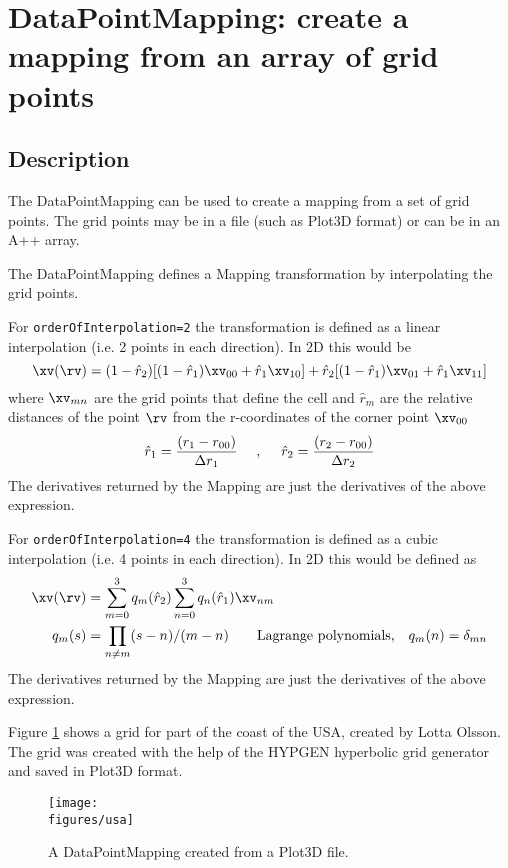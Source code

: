 \section{DataPointMapping: create a mapping from an array of grid points}

\subsection{Description}

The {\ff DataPointMapping} can be used to create a mapping from
a set of grid points.  The grid points may be in a file (such as Plot3D
format) or can be in an A++ array.


\newcommand{\rh}{\hat{r}}
\newcommand{\rvh}{\hat{\rv}}

The {\ff DataPointMapping} defines a Mapping transformation by interpolating
the grid points. 

For {\tt orderOfInterpolation=2} the transformation is
defined as a linear interpolation (i.e. 2 points in each direction). In 2D this would
be
\[
   \xv(\rv) = (1-\rh_2) [ (1-\rh_1)\xv_{00} + \rh_1\xv_{10} ]
            +    \rh_2  [ (1-\rh_1)\xv_{01} + \rh_1\xv_{11} ]
\]
where $\xv_{mn}$ are the grid points that define the cell and $\rh_m$
are the relative distances of the point $\rv$ from the r-coordinates
of the corner point $\xv_{00}$
\[
        \rh_1 = { (r_1-r_{00}) \over \Delta r_1 } ~~~~,~~~~
        \rh_2 = { (r_2-r_{00}) \over \Delta r_2 }
\]
The derivatives returned by the Mapping are just the derivatives of the
above expression. 


For {\tt orderOfInterpolation=4} the transformation is
defined as a cubic interpolation (i.e. 4 points in each direction).
In 2D this would be defined as
\begin{align}
   \xv(\rv) & =  \sum_{m=0}^3 q_m(\rh_2) \sum_{n=0}^3 q_n(\rh_1) \xv_{nm}  \\
   q_m(s) & = \prod_{n\ne m} (s-n)/(m-n) \qquad \mbox{Lagrange polynomials,} \quad q_m(n)=\delta_{mn}
\end{align}
The derivatives returned by the Mapping are just the derivatives of the
above expression. 


Figure \ref{fig:usa} shows a grid for part of the coast of the USA, created by
Lotta Olsson. The grid was created with the help of the HYPGEN hyperbolic grid
generator and saved in Plot3D format.
\begin{figure}[h]
  \begin{center}
  \texttt{[image: \\figures/usa]}
  \caption{A DataPointMapping created from a Plot3D file.}
  \end{center}
\label{fig:usa}
\end{figure}

